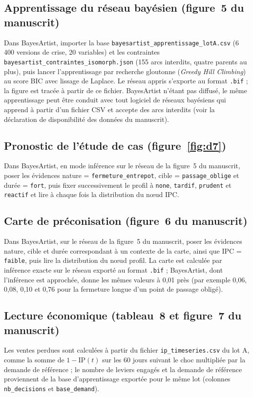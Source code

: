 \subsection*{Apprentissage du réseau bayésien (figure~5 du manuscrit)}

Dans BayesArtist, importer la base \texttt{bayesartist\_apprentissage\_lotA.csv} (6 400 versions de crise, 20 variables) et les contraintes \texttt{bayesartist\_contraintes\_isomorph.json} (155 arcs interdits, quatre parents au plus), puis lancer l'apprentissage par recherche gloutonne (\textit{Greedy Hill Climbing}) au score BIC avec lissage de Laplace. Le réseau appris s'exporte au format \texttt{.bif} ; la figure est tracée à partir de ce fichier. BayesArtist n'étant pas diffusé, le même apprentissage peut être conduit avec tout logiciel de réseaux bayésiens qui apprend à partir d'un fichier CSV et accepte des arcs interdits (voir la déclaration de disponibilité des données du manuscrit).

\subsection*{Pronostic de l'étude de cas (figure~\ref{fig:d7})}

Dans BayesArtist, en mode inférence sur le réseau de la figure~5 du manuscrit, poser les évidences nature = \texttt{fermeture\_entrepot}, cible = \texttt{passage\_oblige} et durée = \texttt{fort}, puis fixer successivement le profil à \texttt{none}, \texttt{tardif}, \texttt{prudent} et \texttt{reactif} et lire à chaque fois la distribution du nœud IPC.

\subsection*{Carte de préconisation (figure~6 du manuscrit)}

Dans BayesArtist, sur le réseau de la figure~5 du manuscrit, poser les évidences nature, cible et durée correspondant à un contexte de la carte, ainsi que IPC = \texttt{faible}, puis lire la distribution du nœud profil. La carte est calculée par inférence exacte sur le réseau exporté au format \texttt{.bif} ; BayesArtist, dont l'inférence est approchée, donne les mêmes valeurs à 0,01 près (par exemple 0,06, 0,08, 0,10 et 0,76 pour la fermeture longue d'un point de passage obligé).

\subsection*{Lecture économique (tableau~8 et figure~7 du manuscrit)}

Les ventes perdues sont calculées à partir du fichier \texttt{ip\_timeseries.csv} du lot A, comme la somme de $1 - \mathrm{IP}(t)$ sur les 60 jours suivant le choc multipliée par la demande de référence ; le nombre de leviers engagés et la demande de référence proviennent de la base d'apprentissage exportée pour le même lot (colonnes \texttt{nb\_decisions} et \texttt{base\_demand}).
